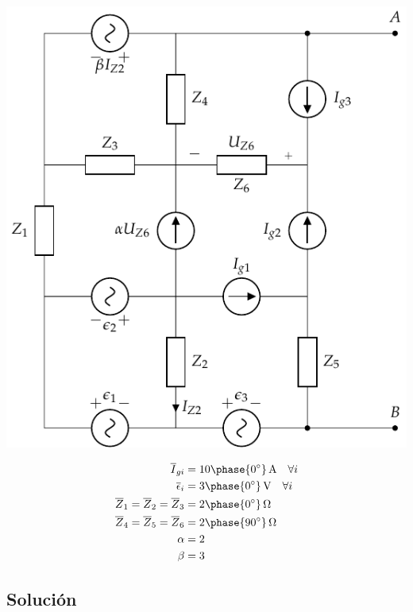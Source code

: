 \documentclass[12pt]{article}
\begin{document}
\begin{minipage}[c]{0.5\linewidth}
\includegraphics[]{figs/thevenin.pdf}  
\end{minipage}
\begin{minipage}[c]{0.5\linewidth}
  \begin{align*}
    \overline{I}_{gi} &= \SI[parse-numbers=false]{10\phase{\ang{0}}}{\ampere} \quad \forall i\\
    \overline{\epsilon}_i &= \SI[parse-numbers=false]{3\phase{\ang{0}}}{\volt} \quad \forall i\\
    \overline{Z}_1 = \overline{Z}_2 = \overline{Z}_3 &= \SI[parse-numbers=false]{2\phase{\ang{0}}}{\ohm} \\
    \overline{Z}_4 = \overline{Z}_5 = \overline{Z}_6 &= \SI[parse-numbers=false]{2\phase{\ang{90}}}{\ohm} \\
    \alpha &= 2\\
    \beta &= 3
  \end{align*}
\end{minipage}


\subsection*{Solución}
\end{document}
